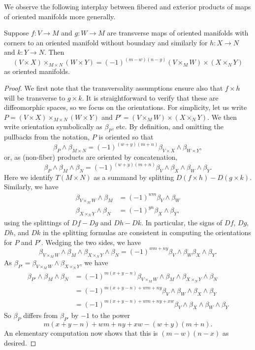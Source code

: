 We observe the following interplay between fibered and exterior products of maps of oriented manifolds more generally.

\begin{proposition}\label{P: oriented interchange}
	Suppose $f \colon V \to M$ and $g \colon W \to M$ are transverse maps of oriented manifolds with corners to an oriented manifold without boundary and similarly for $h \colon X \to N$ and $k \colon Y \to N$.
	Then
	$$(V \times X)\times_{M \times N} (W \times Y) = (-1)^{(m-w)(n-y)}(V \times_M W) \times (X \times_N Y)$$
	as oriented manifolds.
\end{proposition}

\begin{proof}
	We first note that the transversality assumptions ensure also that $f \times h$ will be transverse to $g \times k$.
	It is straightforward to verify that these are diffeomorphic spaces, so we focus on the orientations.
	For simplicity, let us write
	$P = (V \times X)\times_{M \times N} (W \times Y)$ and $P' = (V \times_M W) \times (X \times_N Y)$.
	We then write orientation symbolically as $\beta_P$, etc.
	By definition, and omitting the pullbacks from the notation, $P$ is oriented so that
	$$\beta_P \wedge \beta_{M \times N} = (-1)^{(w+y)(m+n)}\beta_{V \times X} \wedge \beta_{W \times Y},$$
	or, as (non-fiber) products are oriented by concatenation,
	$$\beta_P \wedge \beta_M\wedge\beta_N = (-1)^{(w+y)(m+n)}\beta_V \wedge \beta_X \wedge \beta_W \wedge \beta_Y.$$
	Here we identify $T(M \times N)$ as a summand by splitting $D(f \times h) - D(g \times k)$.
	Similarly, we have
	\begin{align*}
		\beta_{V \times_M W} \wedge \beta_M & = (-1)^{wm}\beta_V \wedge \beta_W \\
		\beta_{X \times_N Y} \wedge \beta_N & = (-1)^{yn}\beta_X \wedge \beta_Y,
	\end{align*}
	using the splittings of $Df-Dg$ and $Dh-Dk$.
	In particular, the signs of $Df$, $Dg$, $Dh$, and $Dk$ in the splitting formulas are consistent in computing the orientations for $P$ and $P'$.
	Wedging the two sides, we have
	\begin{equation*}
		\beta_{V \times_M W} \wedge \beta_M \wedge \beta_{X \times_N Y} \wedge \beta_N =
		(-1)^{wm+ny}\beta_V \wedge \beta_W\beta_X \wedge \beta_Y.
	\end{equation*}
	As $\beta_{P'} = \beta_{V \times_M W} \wedge \beta_{X \times_N Y}$, we have
	\begin{align*}
		\beta_{P'} \wedge \beta_M \wedge \beta_N & =
		(-1)^{m(x+y-n)}\beta_{V \times_M W} \wedge \beta_M \wedge \beta_{X \times_N Y} \wedge \beta_N \\ & = (-1)^{m(x+y-n)+wm+ny}\beta_V \wedge \beta_W \wedge \beta_X \wedge \beta_Y \\ & =
		(-1)^{m(x+y-n)+wm+ny+xw}\beta_V \wedge \beta_X \wedge \beta_W \wedge \beta_Y
	\end{align*}
	So $\beta_P$ differs from $\beta_{P'}$ by $-1$ to the power
	$$m(x+y-n) + wm + ny + xw - (w+y)(m+n).$$
	An elementary computation now shows that this is $(m-w)(n-x)$ as desired.
\end{proof}

